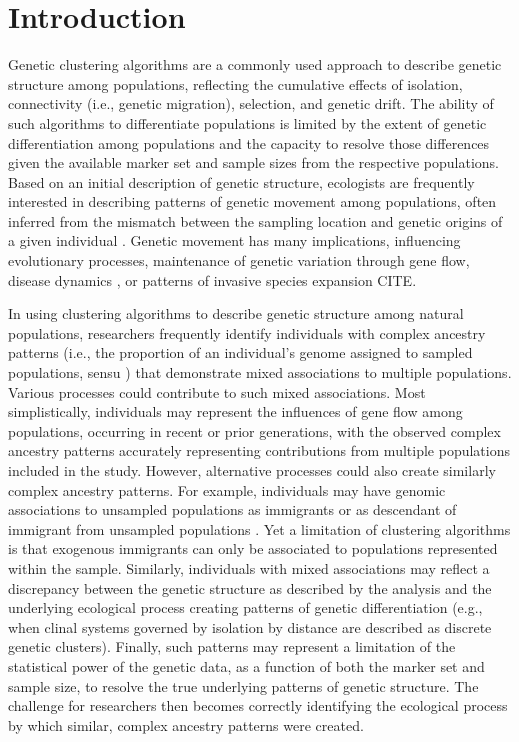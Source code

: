 
\section*{Introduction}

Genetic clustering algorithms are a commonly used approach to describe genetic structure among populations, reflecting the cumulative effects of isolation, connectivity (i.e., genetic migration), selection, and genetic drift.  The ability of such algorithms to differentiate populations is limited by the extent of genetic differentiation among populations and the capacity to resolve those differences given the available marker set and sample sizes from the respective populations.  Based on an initial description of genetic structure, ecologists are frequently interested in describing patterns of genetic movement among populations, often inferred from the mismatch between the sampling location and genetic origins of a given individual \citep{paetkau1995microsatellite,wilson2003bayesian}.  Genetic movement has many implications, influencing evolutionary processes, maintenance of genetic variation through gene flow, disease dynamics \citep{huestis2019windborne}, or patterns of invasive species expansion CITE.

	In using clustering algorithms to describe genetic structure among natural populations, researchers frequently identify individuals with complex ancestry patterns (i.e., the proportion of an individual’s genome assigned to sampled populations, sensu \citealt{pritchard2000inference}) that demonstrate mixed associations to multiple populations.  Various processes could contribute to such mixed associations.  Most simplistically, individuals may represent the influences of gene flow among populations, occurring in recent or prior generations, with the observed complex ancestry patterns accurately representing contributions from multiple populations included in the study.  However, alternative processes could also create similarly complex ancestry patterns.  For example, individuals may have genomic associations to unsampled populations as immigrants or as descendant of immigrant from unsampled populations \citep{pritchard2000inference,beerli2004effect}.  Yet a limitation of clustering algorithms is that exogenous immigrants can only be associated to populations represented within the sample.  Similarly, individuals with mixed associations may reflect a discrepancy between the genetic structure as described by the analysis and the underlying ecological process creating patterns of genetic differentiation (e.g., when clinal systems governed by isolation by distance are described as discrete genetic clusters).  Finally, such patterns may represent a limitation of the statistical power of the genetic data, as a function of both the marker set and sample size, to resolve the true underlying patterns of genetic structure.  The challenge for researchers then becomes correctly identifying the ecological process by which similar, complex ancestry patterns were created.  
	
